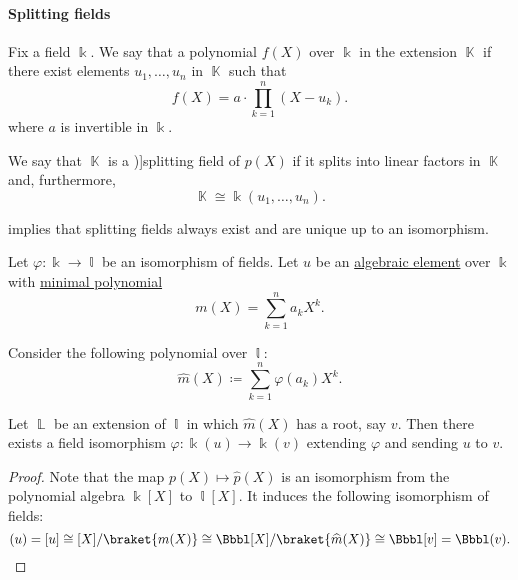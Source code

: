 \paragraph{Splitting fields}

\begin{definition}\label{def:splitting_field}
  Fix a field \( \Bbbk \). We say that a polynomial \( f(X) \) over \( \Bbbk \)  in the extension \( \BbbK \) if there exist elements \( u_1, \ldots, u_n \) in \( \BbbK \) such that
  \begin{equation*}
    f(X) = a \cdot \prod_{k=1}^n (X - u_k).
  \end{equation*}
  where \( a \) is invertible in \( \Bbbk \).

  We say that \( \BbbK \) is a \term[ru=поле разложения (def. \cite[9.5.2]{Винберг2014Алгебра})]{splitting field} of \( p(X) \) if it splits into linear factors in \( \BbbK \) and, furthermore,
  \begin{equation*}
    \BbbK \cong \Bbbk(u_1, \ldots, u_n).
  \end{equation*}
\end{definition}
\begin{comments}
  \item {} implies that splitting fields always exist and are unique up to an isomorphism.
\end{comments}

\begin{lemma}\label{thm:splitting_field_uniqueness_step}
  Let \( \varphi: \Bbbk \to \Bbbl \) be an isomorphism of fields. Let \( u \) be an \hyperref[def:algebraic_element]{algebraic element} over \( \Bbbk \) with \hyperref[def:algebraic_element_minimal_polynomial]{minimal polynomial}
  \begin{equation*}
     m(X) = \sum_{k=1}^n a_k X^k.
  \end{equation*}

  Consider the following polynomial over \( \Bbbl \):
  \begin{equation*}
    \widehat{m}(X) \coloneqq \sum_{k=1}^n \varphi(a_k) X^k.
  \end{equation*}

  Let \( \BbbL \) be an extension of \( \Bbbl \) in which \( \widehat{m}(X) \) has a root, say \( v \). Then there exists a field isomorphism \( \varphi: \Bbbk(u) \to \Bbbk(v) \) extending \( \varphi \) and sending \( u \) to \( v \).
\end{lemma}
\begin{proof}
  Note that the map \( p(X) \mapsto \widehat{p}(X) \) is an isomorphism from the polynomial algebra \( \Bbbk[X] \) to \( \Bbbl[X] \). It induces the following isomorphism of fields:
  \begin{equation*}
    \Bbbk(u) = \Bbbk[u] \cong \Bbbk[X] / \braket{ m(X) } \cong \Bbbl[X] / \braket{ \widehat{m}(X) } \cong \Bbbl[v] = \Bbbl(v).
  \end{equation*}
\end{proof}

